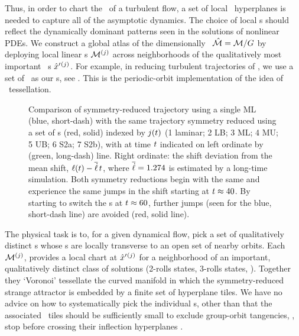 Thus, in order to chart the \statesp\ of a turbulent flow, a set
of local \slice\ hyperplanes is needed to capture all of the asymptotic
dynamics. The choice of local \slice s should reflect the dynamically
dominant patterns seen in the solutions of nonlinear PDEs. We construct a
global atlas of the dimensionally \reducedsp\ $\hat{\cal M} = {\cal M}/G$ by
deploying local linear \slice s  ${\cal M}{}^{(j)}$ across neighborhoods of
the qualitatively most important \template\ {\cohStr s}
${\hat{x}'}{}^{(j)}$. For example, in reducing turbulent trajectories of
, we use a set of \reqva\ as our \template s, see
. This is the periodic-orbit implementation of the
idea of {\statesp\ tessellation}.
\begin{figure}
  \centering
  \caption{\label{fig:thetadot2}
Comparison of symmetry-reduced trajectory using a single {\template} ML
(blue, short-dash) with the same trajectory symmetry reduced using a set
of \template s (red, solid) indexed by $j(t)$ (1 laminar; 2 LB; 3 ML; 4
MU; 5 UB; 6 S2a; 7 S2b), with {\template} at time $t$ indicated on left
ordinate by (green, long-dash) line. Right ordinate: the shift deviation
from the mean shift, $\ell(t)-\overline{\dot{\ell}}\,t$,
where $\overline{\dot{\ell}}=1.274$ is estimated by a long-time
simulation. Both symmetry reductions begin with the same {\template} and
experience the same jumps in the shift starting at $t\approx 40$. By
starting to switch the \template s at $t\approx 60$, further jumps
(seen for the blue, short-dash line) are avoided (red, solid line).
  }
\end{figure}

The physical task is to, for a given dynamical flow, pick a set of
qualitatively distinct {\template s} whose \slice s  are locally
transverse to an open set of nearby orbits. Each \slice\ ${\cal M}{}^{(j)}$,
provides a local chart at ${\hat{x}'}{}^{(j)}$ for a neighborhood of an
important, qualitatively distinct class of solutions (2-rolls states,
3-rolls states, \etc). Together they `Voronoi' tessellate  the curved
manifold in which the symmetry-reduced strange attractor is embedded by a
finite set of hyperplane tiles. We have no advice on how to
systematically pick the individual \template s, other than that the
associated \slice\ tiles should be sufficiently small to exclude
group-orbit tangencies, \ie, stop before crossing their inflection
hyperplanes .


